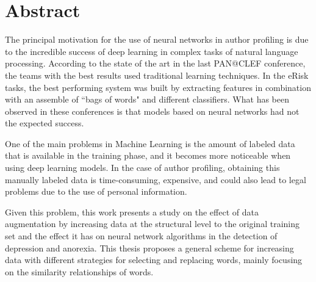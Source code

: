 \chapter{Abstract}
The principal motivation for the use of neural networks in author profiling is due to the incredible success of deep learning in complex tasks of natural language processing. According to the state of the art in the last PAN@CLEF conference, the teams with the best results used traditional learning techniques. In the eRisk tasks, the best performing system was built by extracting features in combination with an assemble of ``bags of words" and different classifiers. What has been observed in these conferences is that models based on neural networks had not the expected success.

One of the main problems in Machine Learning is the amount of labeled data that is available in the training phase, and it becomes more noticeable when using deep learning models. In the case of author profiling, obtaining this manually labeled data is time-consuming, expensive, and could also lead to legal problems due to the use of personal information.

Given this problem, this work presents a study on the effect of data augmentation by increasing data at the structural level to the original training set and the effect it has on neural network algorithms in the detection of depression and anorexia. This thesis proposes a general scheme for increasing data with different strategies for selecting and replacing words, mainly focusing on the similarity relationships of words.